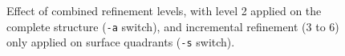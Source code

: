 \documentclass[10pt]{article}
\begin{document}
\begin{figure}[htb]
{  \label{f:pierefs5}
 }
\centering
 \caption{Effect of combined refinement levels, with level 2 applied on the complete structure (\texttt{-a} switch), and incremental refinement (3 to 6) only applied on surface quadrants (\texttt{-s} switch).}
\label{fig:pierefs}
\end{figure}
\end{document}
